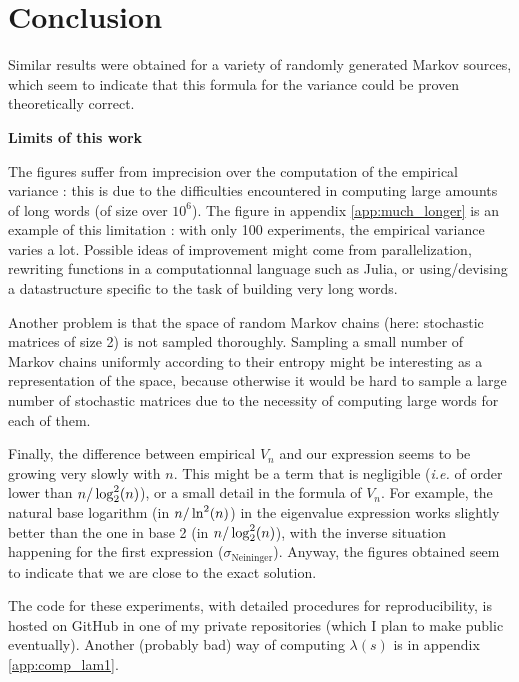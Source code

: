 \section{Conclusion}
Similar results were obtained for a variety of randomly generated Markov sources,
which seem to indicate that this formula for the variance could be proven theoretically
correct. 

\begin{remarque}
\noindent \textbf{Limits of this work}


The figures suffer from imprecision over the computation of the empirical 
variance : this is due to the difficulties encountered in computing large amounts
of long words (of size over $10^6$). The figure in appendix \ref{app:much_longer} is 
an example of this limitation : with only 100 experiments, the empirical variance 
varies a lot. Possible ideas of improvement might come from parallelization,
rewriting functions in a computationnal language such as Julia, or using/devising a datastructure
specific to the task of building very long words.

Another problem is that the space of random Markov chains (here: stochastic matrices
of size 2) is not sampled thoroughly. Sampling a small number of Markov chains uniformly
according to their entropy might be interesting as a representation of the space,
 because otherwise it would be hard to sample a large number of stochastic matrices
due to the necessity of computing large words for each of them.

Finally, the difference between empirical $V_n$ and our expression seems to be growing
very slowly with $n$. This might be a term that is negligible (\textit{i.e.} of 
order lower than $n/\log_2^2(n)$), or a small detail in the formula of $V_n$. 
For example, the natural base logarithm (in $n/\ln^2(n)$) in the eigenvalue expression works slightly
better than the one in base 2 (in $n/\log_2^2(n)$), with the inverse situation happening for the first 
expression ($\sigma_{\text{Neininger}}$). Anyway, the figures obtained seem to 
indicate that we are close to the exact solution.

\end{remarque}


The code for these experiments, with detailed procedures for reproducibility,
is hosted on GitHub in one of my private repositories (which I plan to make public
eventually).
Another (probably bad) way of computing $\lambda(s)$ is in appendix \ref{app:comp_lam1}. 




